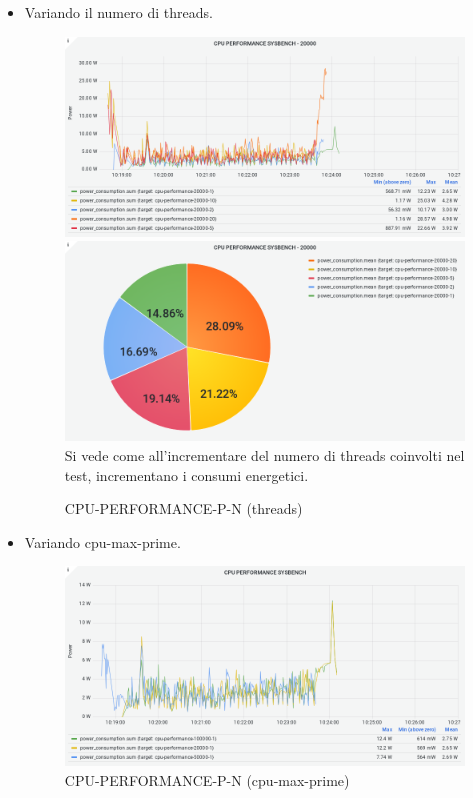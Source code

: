 \documentclass[a4paper, 11pt]{article}
\begin{document}
\begin{itemize}
\item  Variando il numero di threads. 
\begin{figure}[h]
\caption{CPU-PERFORMANCE-P-N (threads)}
\includegraphics[scale=0.4]{image10}
\includegraphics[scale=0.4]{image38}
\\ Si vede come all'incrementare del numero di threads coinvolti nel test, incrementano i consumi energetici.
\end{figure}
\clearpage
\item Variando cpu-max-prime.
\begin{figure}[h]
\caption{CPU-PERFORMANCE-P-N (cpu-max-prime)}
\begin{flushleft}
\includegraphics[scale=0.4]{image8}

\end{flushleft}
\end{figure}
\end{itemize}
\end{document}
